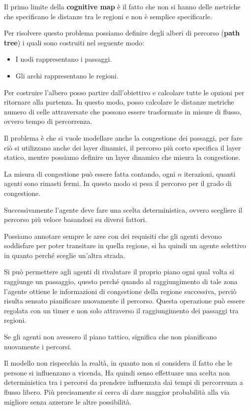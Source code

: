 Il primo limite della \textbf{cognitive map} è il fatto che non si hanno delle
metriche che specificano le distanze tra le regioni e non è semplice specificarle.

Per risolvere questo problema possiamo definire degli alberi di percorso
(\textbf{path tree}) i quali sono costruiti nel seguente modo:
\begin{itemize}
    \item I nodi rappresentano i passaggi.
    \item Gli archi rappresentano le regioni.
\end{itemize}

Per costruire l'albero posso partire dall'obiettivo e calcolare tutte le opzioni
per ritornare alla partenza. In questo modo, posso calcolare le distanze metriche
numero di celle attraversate che possono essere trasformate in misure di flusso,
ovvero tempo di percorrenza.

Il problema è che si vuole modellare anche la congestione dei passaggi, per fare
ciò si utilizzano anche dei layer dinamici, il percorso più corto specifica
il layer statico, mentre possiamo definire un layer dinamico che misura la congestione.

La misura di congestione può essere fatta contando, ogni $n$ iterazioni, quanti
agenti sono rimasti fermi. In questo modo si pesa il percorso per il grado di
congestione.

Successivamente l'agente deve fare una scelta deterministica, ovvero scegliere
il percorso più veloce basandosi su diversi fattori.

Possiamo annotare sempre le aree con dei requisiti che gli agenti devono soddisfare
per poter transitare in quella regione, si ha quindi un agente selettivo in
quanto perché sceglie un'altra strada.

Si può permettere agli agenti di rivalutare il proprio piano ogni qual volta
si raggiunge un passaggio, questo perché quando al raggiungimento di tale zona
l'agente ottiene le informazioni di congestione della regione successiva, perciò
risulta sensato pianificare nuovamente il percorso. Questa operazione può essere
regolata con un timer e non solo attraverso il raggiungimento dei passaggi tra
regioni.
\begin{nota}
    Se gli agenti non avessero il piano tattico, significa che non pianificano
    nuovamente i percorsi.
\end{nota}
Il modello non rispecchia la realtà, in quanto non si considera il fatto che le
persone si influenzano a vicenda. Ha quindi senso effettuare una scelta non
deterministica tra i percorsi da prendere influenzata dai tempi di percorrenza a
flusso libero. Più precisamente si cerca di dare maggior probabilità alla via
migliore senza azzerare le altre possibilità.

